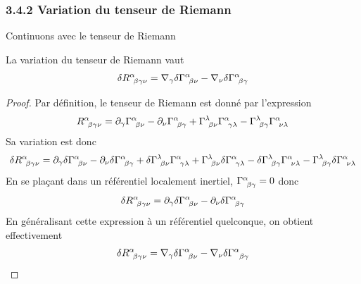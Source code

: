 \subsubsection{3.4.2 Variation du tenseur de Riemann}
Continuons avec le tenseur de Riemann
\begin{theoremframe}
    \begin{propri}
        La variation du tenseur de Riemann vaut
        \begin{equation}
            \delta R\indices{^{\alpha}_{\!\beta \gamma \nu}} = \nabla_{\gamma}\delta\Gamma\indices{^{\alpha}_{\!\beta \nu}} - \nabla_{\nu} \delta \Gamma\indices{^{\alpha}_{\!\beta \gamma}}
        \end{equation}
    \end{propri}
\end{theoremframe}
\begin{proof}
    Par définition, le tenseur de Riemann est donné par l'expression
    \begin{equation}
        R\indices{^{\alpha}_{\!\beta \gamma \nu}} = \partial_{\gamma}\Gamma\indices{^{\alpha}_{\!\beta \nu}} - \partial_{\nu} \Gamma\indices{^{\alpha}_{\!\beta \gamma}} + \Gamma\indices{^{\lambda}_{\!\beta \nu}}\Gamma\indices{^{\alpha}_{\!\gamma \lambda}} - \Gamma\indices{^{\lambda}_{\!\beta \gamma}}\Gamma\indices{^{\alpha}_{\!\nu \lambda}}
    \end{equation}
    Sa variation est donc
    \begin{align}
        \delta R\indices{^{\alpha}_{\!\beta \gamma \nu}} = \partial_{\gamma}\delta\Gamma\indices{^{\alpha}_{\!\beta \nu}} - \partial_{\nu} \delta \Gamma\indices{^{\alpha}_{\!\beta \gamma}} + \delta\Gamma\indices{^{\lambda}_{\!\beta \nu}}\Gamma\indices{^{\alpha}_{\!\gamma \lambda}} + \Gamma\indices{^{\lambda}_{\!\beta \nu}}\delta\Gamma\indices{^{\alpha}_{\!\gamma \lambda}} - \delta\Gamma\indices{^{\lambda}_{\!\beta \gamma}}\Gamma\indices{^{\alpha}_{\!\nu \lambda}} - \Gamma\indices{^{\lambda}_{\!\beta \gamma}}\delta\Gamma\indices{^{\alpha}_{\!\nu \lambda}}
    \end{align}
    En se plaçant dans un référentiel localement inertiel, $\Gamma\indices{^{\alpha}_{\!\beta \gamma}} = 0$ donc
    \begin{equation}
        \delta R\indices{^{\alpha}_{\!\beta \gamma \nu}} = \partial_{\gamma}\delta\Gamma\indices{^{\alpha}_{\!\beta \nu}} - \partial_{\nu} \delta \Gamma\indices{^{\alpha}_{\!\beta \gamma}}
    \end{equation}
    En généralisant cette expression à un référentiel quelconque, on obtient effectivement
    \begin{equation}
        \delta R\indices{^{\alpha}_{\!\beta \gamma \nu}} = \nabla_{\gamma}\delta\Gamma\indices{^{\alpha}_{\!\beta \nu}} - \nabla_{\nu} \delta \Gamma\indices{^{\alpha}_{\beta \gamma}}
    \end{equation}
\end{proof}
